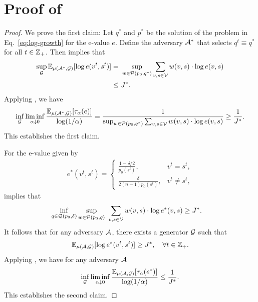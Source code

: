 \section{Proof of }\label{sec:tau-proof}

\begin{proof}
We prove the first claim: Let $q^*$ and $p^*$ be the solution of the problem in Eq.~\eqref{eq:log-growth} for the e-value $e$. Define the adversary $\mathcal{A}^*$ that selects $q^t \equiv q^*$ for all $t \in \mathbb{Z}_+$. Then  implies that 
\begin{align*}
\sup_{\mathcal{G}} \mathbb{E}_{\mu(\mathcal{A}^*,\mathcal{G})}[\log e(v^t,s^t)] = &~
    \sup_{w \in \mathcal{P}(p_0,q^*)} \sum_{v,s \in \mathcal{V}} w(v,s) \cdot \log e(v,s) \\
    \leq &~ J^*.
\end{align*}
Applying , we have 
\begin{align*}
    \inf_{\mathcal{G}} \liminf_{\alpha \downarrow 0} \frac{\mathbb{E}_{\mu(\mathcal{A}^*,\mathcal{G})}[\tau_\alpha(e)]}{\log(1/\alpha)} = \frac{1}{\sup_{w \in \mathcal{P}(p_0,q^*)} \sum_{v,s \in \mathcal{V}} w(v,s) \cdot \log e(v,s)} \geq \frac{1}{J^*}.
\end{align*}
This establishes the first claim.

For the e-value given by
\begin{align*}
    e^*(v^t,s^t) = \begin{cases}
       \frac{1-\delta/2}{p_0(s^t)}, & v^t = s^t,\\
       \frac{\delta}{2(n-1)p_0(s^t)}, & v^t\neq s^t,
    \end{cases}
\end{align*}
 implies that 
\begin{align*}
    \inf_{q \in \mathcal{Q}(p_0,\delta)} \sup_{w \in \mathcal{P}(p_0,q)} &~  \sum_{v,s \in \mathcal{V}} w(v,s) \cdot \log e^*(v,s) \geq J^*.
\end{align*}
It follows that for any adversary $\mathcal{A}$, there exists a generator $\mathcal{G}$ such that
\begin{align*}
    \mathbb{E}_{\mu(\mathcal{A},\mathcal{G})}[\log e^*(v^t,s^t)] \geq J^* ,\quad \forall t \in \mathbb{Z}_+.
\end{align*}
Applying , we have for any adversary $\mathcal{A}$
\begin{align*}
    \inf_{\mathcal{G}} \liminf_{\alpha \downarrow 0} \frac{\mathbb{E}_{\mu(\mathcal{A},\mathcal{G})}[\tau_\alpha(e^*)]}{\log(1/\alpha)} \leq \frac{1}{J^*}.
\end{align*}
This establishes the second claim.
\end{proof}

